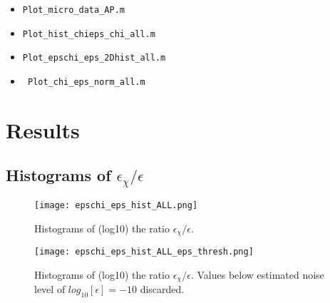 \documentclass[11pt]{article}
\begin{document}
\begin{itemize}

\item \verb+Plot_micro_data_AP.m+

\item \verb+Plot_hist_chieps_chi_all.m+

\item \verb+Plot_epschi_eps_2Dhist_all.m+

\item \verb+ Plot_chi_eps_norm_all.m+

\end{itemize}


%
%
%
%


\section{Results}



\subsection{Histograms of $\epsilon_{\chi}/\epsilon$}

\begin{figure}[htbp]
\texttt{[image: epschi\_eps\_hist\_ALL.png]}
\caption{Histograms of (log10) the ratio $\epsilon_{\chi}/\epsilon$.}
\label{}
\end{figure}


\begin{figure}[htbp]
\texttt{[image: epschi\_eps\_hist\_ALL\_eps\_thresh.png]}
\caption{Histograms of (log10) the ratio $\epsilon_{\chi}/\epsilon$. Values below estimated noise level of $log_{10}[\epsilon]=-10$ discarded.}
\label{}
\end{figure}


\end{document}
